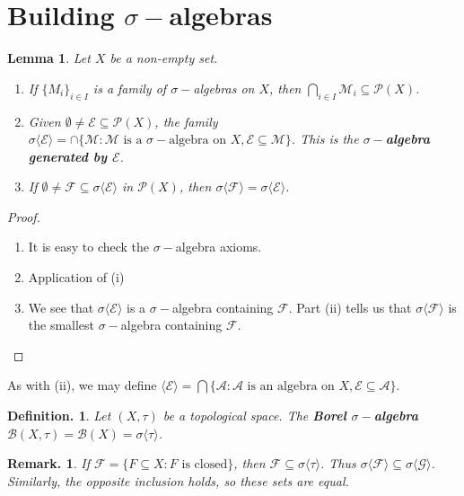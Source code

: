 \documentclass[12pt, a4paper]{memoir}
\newtheorem{lemma}[theorem]{Lemma}
\theoremstyle{nonumberplain}
\newtheorem{definition}{Definition.}
\newtheorem{remark}{Remark.}
\newtheorem{proof}{Proof}
\begin{document}
\section{Building \texorpdfstring{$\sigma-$}{s-}algebras}
\begin{lemma}
    Let $X$ be a non-empty set.
    \begin{enumerate}[nolistsep,label=(\roman*)]
        \item If $\{M_i\}_{i\in I}$ is a family of $\sigma-$algebras on $X$, then $\bigcap_{i\in I}\mathcal{M}_i\subseteq\mathcal{P}(X)$.
        \item Given $\emptyset\neq\mathcal{E}\subseteq\mathcal{P}(X)$, the family $\sigma\langle\mathcal{E}\rangle=\cap\{\mathcal{M}:\mathcal{M}\text{ is a $\sigma-$algebra on }X,\mathcal{E}\subseteq\mathcal{M}\}$.
            This is the \textbf{$\sigma-$algebra generated by $\mathcal{E}$}.
        \item If $\emptyset\neq\mathcal{F}\subseteq\sigma\langle\mathcal{E}\rangle$ in $\mathcal{P}(X)$, then $\sigma\langle\mathcal{F}\rangle=\sigma\langle\mathcal{E}\rangle$.
    \end{enumerate}
\end{lemma}
\begin{proof}
    \begin{enumerate}[nolistsep,label=(\roman*)]
        \item It is easy to check the $\sigma-$algebra axioms.
        \item Application of (i)
        \item We see that $\sigma\langle\mathcal{E}\rangle$ is a $\sigma-$algebra containing $\mathcal{F}$.
            Part (ii) tells us that $\sigma\langle\mathcal{F}\rangle$ is the smallest $\sigma-$algebra containing $\mathcal{F}$.
    \end{enumerate}
\end{proof}
As with (ii), we may define $\langle\mathcal{E}\rangle=\bigcap\{\mathcal{A}:\mathcal{A}\text{ is an algebra on }X,\mathcal{E}\subseteq\mathcal{A}\}$.
\begin{definition}
    Let $(X,\tau)$ be a topological space.
    The \textbf{Borel $\sigma-$algebra} $\mathcal{B}(X,\tau)=\mathcal{B}(X)=\sigma\langle\tau\rangle$.
\end{definition}
\begin{remark}
    If $\mathcal{F}=\{F\subseteq X:F\text{ is closed}\}$, then $\mathcal{F}\subseteq\sigma\langle\tau\rangle$.
    Thus $\sigma\langle\mathcal{F}\rangle\subseteq\sigma\langle\mathcal{G}\rangle$.
    Similarly, the opposite inclusion holds, so these sets are equal.
\end{remark}
\end{document}
